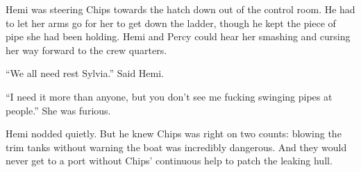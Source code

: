 \documentclass[]{article}
\begin{document}
\begin{multicols}{2}
Hemi was steering Chips towards the hatch down out of the control room.
He had to let her arms go for her to get down the ladder, though he kept
the piece of pipe she had been holding. Hemi and Percy could hear her
smashing and cursing her way forward to the crew quarters.

``We all need rest Sylvia.'' Said Hemi.

``I need it more than anyone, but you don't see me fucking swinging
pipes at people.'' She was furious.

Hemi nodded quietly. But he knew Chips was right on two counts: blowing
the trim tanks without warning the boat was incredibly dangerous. And
they would never get to a port without Chips' continuous help to patch
the leaking hull.


 
\end{multicols} %
\end{document}
